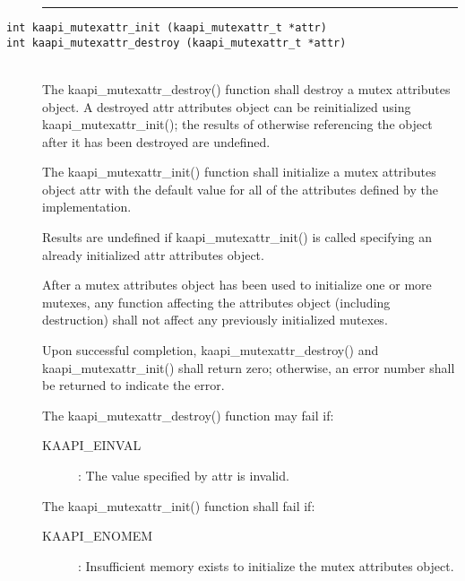 \begin{description}
\vspace*{3ex} \hrule width 4cm
\item [\texttt{int kaapi\_mutexattr\_init (kaapi\_mutexattr\_t *attr)}]
\item [\texttt{int kaapi\_mutexattr\_destroy (kaapi\_mutexattr\_t *attr)}]~\\

The kaapi\_mutexattr\_destroy() function shall destroy a mutex attributes
object. A destroyed attr attributes object can be reinitialized using
kaapi\_mutexattr\_init(); the results of otherwise referencing the object
after it has been destroyed are undefined.

The kaapi\_mutexattr\_init() function shall initialize a mutex attributes
object attr with the default value for all of the attributes defined by the
implementation.

Results are undefined if kaapi\_mutexattr\_init() is called specifying an
already initialized attr attributes object.

After a mutex attributes object has been used to initialize one or more
mutexes, any function affecting the attributes object (including destruction)
shall not affect any previously initialized mutexes.

Upon successful completion, kaapi\_mutexattr\_destroy() and
kaapi\_mutexattr\_init() shall return zero; otherwise, an error number shall
be returned to indicate the error.

The kaapi\_mutexattr\_destroy() function may fail if:

\begin{description}
\item [KAAPI\_EINVAL]: The value specified by attr is invalid.
\end{description}

The kaapi\_mutexattr\_init() function shall fail if:

\begin{description}
\item [KAAPI\_ENOMEM]: Insufficient memory exists to initialize the mutex
  attributes object. 
\end{description}
\end{description}


